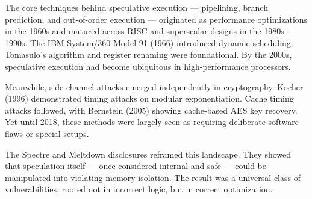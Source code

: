 \begin{historical}
The core techniques behind speculative execution — pipelining, branch prediction, and out-of-order execution — originated as performance optimizations in the 1960s and matured across RISC and superscalar designs in the 1980s–1990s. The IBM System/360 Model 91 (1966) introduced dynamic scheduling. Tomasulo's algorithm and register renaming were foundational. By the 2000s, speculative execution had become ubiquitous in high-performance processors.

Meanwhile, side-channel attacks emerged independently in cryptography. Kocher (1996) demonstrated timing attacks on modular exponentiation. Cache timing attacks followed, with Bernstein (2005) showing cache-based AES key recovery. Yet until 2018, these methods were largely seen as requiring deliberate software flaws or special setups.

The Spectre and Meltdown disclosures reframed this landscape. They showed that speculation itself — once considered internal and safe — could be manipulated into violating memory isolation. The result was a universal class of vulnerabilities, rooted not in incorrect logic, but in correct optimization.
\end{historical}
